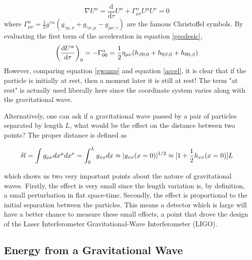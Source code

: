 \documentclass[oneside]{book}
\begin{document}
	\begin{equation}\label{geodesic}
	\nabla U^{\alpha} = \frac{\text{d}}{\text{d} \tau} U^{\alpha} + \Gamma^{\alpha}_{\mu \nu} U^{\mu} U^{\nu} = 0
	\end{equation}	
	where $\Gamma^{\alpha}_{\mu \nu} = \frac{1}{2} g^{\gamma \alpha}(g_{\gamma \mu, \nu} + g_{\gamma \nu,\mu} - g_{\mu \nu, \gamma} )$ are the famous Christoffel symbols.
	By evaluating the first term of the acceleration in equation \ref{geodesic},
	\begin{equation}\label{accel}
	\bigg(\frac{\text{d}U^{\alpha}}{\text{d}\tau}\bigg)_0 = -\Gamma^{\alpha}_{00} 
	\\ = \frac{1}{2} \eta_{\mu \nu} (h_{\beta 0, 0} + h_{0 \beta, 0} + h_{0 0, \beta} )
	\end{equation}
	However, comparing equation \ref{gwamp} and equation \ref{accel}, it is clear that if the particle is initially at rest, then a moment later it is still at rest! The term "at rest" is actually used liberally here since the coordinate system varies along with the gravitational wave. 
	
	Alternatively, one can ask if a gravitational wave passed by a pair of particles separated by length $L$, what would be the effect on the distance between two points?  The proper distance is defined as

	\begin{equation}\label{propdist}
	\delta l
	= \int{g_{\mu \nu} dx^{\mu} dx^{\nu}} \\
	= \int_{0}^{L}{g_{xx} {d}x}\\
	\approx |g_{xx}(x=0)|^{1/2}\\
	\approx [ 1 + \frac{1}{2} h_{xx}(x=0)] L
	\end{equation} 
	
	which shows us two very important points about the nature of gravitational waves.  Firstly, the effect is very small since the length variation is, by definition, a small perturbation in flat space-time.  Secondly, the effect is proportional to the initial separation between the particles. This means a detector which is large will have a better chance to measure these small effects, a point that drove the design of the Laser Interferometer Gravitational-Wave Interferometer (LIGO).
	
	
	\subsection{Energy from a Gravitational Wave}
	
\end{document}
